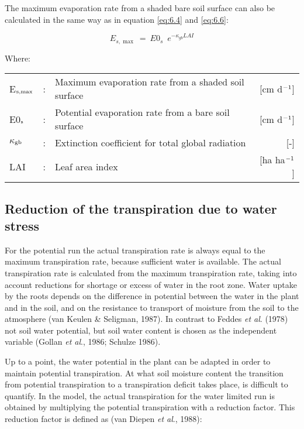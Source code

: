 The maximum evaporation rate from a shaded bare soil surface can also be calculated in
the same way as in equation \ref{eq:6.4} and \ref{eq:6.6}:

\begin{equation}
E_{s,\max } ~=~ E0 _{s} \,\,\, e ^{-\kappa  _{gb} LAI}
\end{equation}

Where:\\[5pt]
\begin{tabularx}{\textwidth}{llXr}
E$_{{\rm s,max}}$ &:& Maximum evaporation rate from a shaded 
    soil surface & [cm d$^{{\rm -1}}$]\\
E0$_{{\rm s}}$ &:& Potential evaporation rate from a bare soil 
    surface & [cm d$^{{\rm -1}}$]\\
$\kappa$$_{{\rm gb}}$ &:& Extinction coefficient for total global radiation & [-]\\
LAI &:& Leaf area index & [ha ha$^{{\rm -1}}$]\\
\end{tabularx}

\subsection{Reduction of the transpiration due to water stress}

For the potential run the actual transpiration rate is always equal to the maximum
transpiration rate, because sufficient water is available. The actual transpiration rate is
calculated from the maximum transpiration rate, taking into account reductions for
shortage or excess of water in the root zone. Water uptake by the roots depends on the
difference in potential between the water in the plant and in the soil, and on the resistance
to transport of moisture from the soil to the atmosphere (van Keulen \& Seligman, 1987).
In contrast to Feddes {\it et al}. (1978) not soil water potential, but soil water content is
chosen as the independent variable (Gollan {\it et al}., 1986; Schulze 1986).

Up to a point, the water potential in the plant can be adapted in order to maintain
potential transpiration. At what soil moisture content the transition from potential
transpiration to a transpiration deficit takes place, is difficult to quantify. In the model,
the actual transpiration for the water limited run is obtained by multiplying the potential
transpiration with a reduction factor. This reduction factor is defined as (van Diepen {\it et
al}., 1988):

